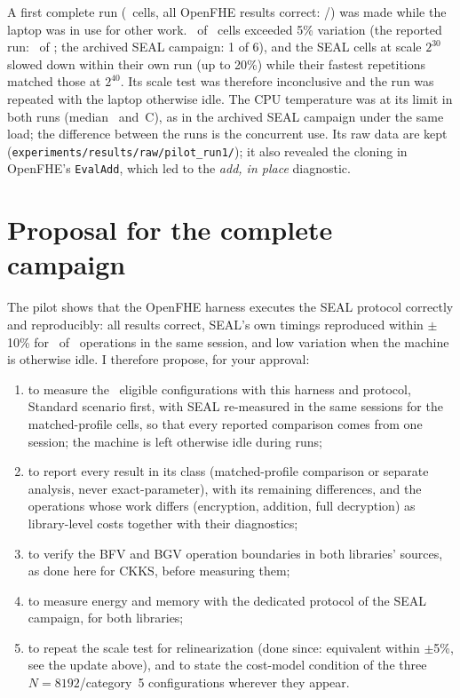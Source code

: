 \documentclass[11pt]{article}
\begin{document}
A first complete run (\runoneCells\ cells, all OpenFHE results correct: \runoneCorrectOK/\runoneCorrectN) was made while the laptop was in use for other work. \runoneHighVar\ of \runoneCells\ cells exceeded 5\% variation (the reported run: \pilotHighVar\ of \pilotCells; the archived SEAL campaign: 1 of 6), and the SEAL cells at scale $2^{30}$ slowed down within their own run (up to 20\%) while their fastest repetitions matched those at $2^{40}$. Its scale test was therefore inconclusive and the run was repeated with the laptop otherwise idle. The CPU temperature was at its limit in both runs (median \runoneTempMedian\ and \pilotTempMedian\,\textdegree C), as in the archived SEAL campaign under the same load; the difference between the runs is the concurrent use. Its raw data are kept (\texttt{experiments/results/raw/pilot\_run1/}); it also revealed the cloning in OpenFHE's \texttt{EvalAdd}, which led to the \emph{add, in place} diagnostic.

\section{Proposal for the complete campaign}

The pilot shows that the OpenFHE harness executes the SEAL protocol correctly and reproducibly: all results correct, SEAL's own timings reproduced within $\pm$10\% for \pilotReproEq\ of \pilotReproN\ operations in the same session, and low variation when the machine is otherwise idle. I therefore propose, for your approval:
\begin{enumerate}[leftmargin=*, itemsep=2pt]
  \item to measure the \eligible\ eligible configurations with this harness and protocol, Standard scenario first, with SEAL re-measured in the same sessions for the matched-profile cells, so that every reported comparison comes from one session; the machine is left otherwise idle during runs;
  \item to report every result in its class (matched-profile comparison or separate analysis, never exact-parameter), with its remaining differences, and the operations whose work differs (encryption, addition, full decryption) as library-level costs together with their diagnostics;
  \item to verify the BFV and BGV operation boundaries in both libraries' sources, as done here for CKKS, before measuring them;
  \item to measure energy and memory with the dedicated protocol of the SEAL campaign, for both libraries;
  \item to repeat the scale test for relinearization (done since: equivalent within $\pm$5\%, see the update above), and to state the cost-model condition of the three $N{=}8192$/category~5 configurations wherever they appear.
\end{enumerate}
\end{document}
